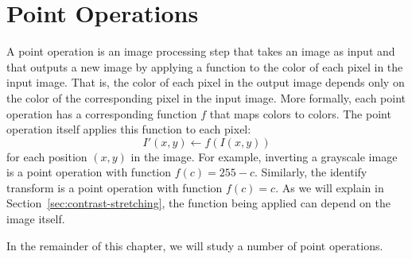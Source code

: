 \documentclass{book}
\begin{document}
\addtocounter{chapter}{3}

\chapter{Point Operations}
A point operation is an image processing step that takes an image as input and that outputs a new image by applying a function to the color of each pixel in the input image. That is, the color of each pixel in the output image depends only on the color of the corresponding pixel in the input image. More formally, each point operation has a corresponding function $f$ that maps colors to colors. The point operation itself applies this function to each pixel:
$$I'(x, y) \leftarrow f(I(x, y))$$
for each position $(x, y)$ in the image. For example, inverting a grayscale image is a point operation with function $f(c) = 255 - c$. Similarly, the identify transform is a point operation with function $f(c) = c$. As we will explain in Section~\ref{sec:contrast-stretching}, the function being applied can depend on the image itself.

In the remainder of this chapter, we will study a number of point operations.
\end{document}
